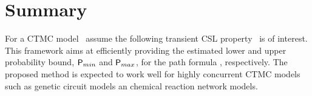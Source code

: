 \section{Summary}

For a CTMC model \model\, assume the following transient CSL property
\cslEventually\ is of interest. This framework aims at efficiently
providing the estimated lower and upper probability bound,
\ensuremath{\probOp_{min}} and \ensuremath{\probOp_{max}}, for the path 
formula \eventually, respectively. The proposed method is expected
to work well for highly concurrent CTMC models such as genetic circuit
models an chemical reaction network models. 

